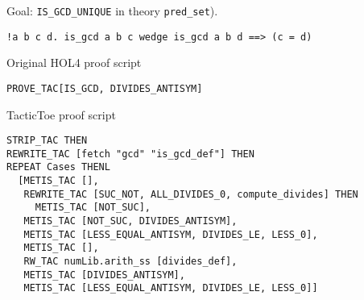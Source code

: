 \documentclass[runningheads,a4paper,draft]{svjour3}
\def\holfour{\textsf{HOL4}\xspace}
\def\tactictoe{\textsf{TacticToe}\xspace}
\begin{document}


%

Goal: \texttt{IS\_GCD\_UNIQUE} in theory \texttt{pred\_set}).
\begin{lstlisting}[language=SMLSmall,frame=tb]
!a b c d. is_gcd a b c wedge is_gcd a b d ==> (c = d)
\end{lstlisting}

Original \holfour proof script
\begin{lstlisting}[language=SMLSmall,frame=tb]
PROVE_TAC[IS_GCD, DIVIDES_ANTISYM]
\end{lstlisting}

\vspace{5mm}

\tactictoe proof script
\begin{lstlisting}[language=SMLSmall,frame=tb]
STRIP_TAC THEN 
REWRITE_TAC [fetch "gcd" "is_gcd_def"] THEN 
REPEAT Cases THENL 
  [METIS_TAC [], 
   REWRITE_TAC [SUC_NOT, ALL_DIVIDES_0, compute_divides] THEN 
     METIS_TAC [NOT_SUC], 
   METIS_TAC [NOT_SUC, DIVIDES_ANTISYM], 
   METIS_TAC [LESS_EQUAL_ANTISYM, DIVIDES_LE, LESS_0], 
   METIS_TAC [], 
   RW_TAC numLib.arith_ss [divides_def], 
   METIS_TAC [DIVIDES_ANTISYM],
   METIS_TAC [LESS_EQUAL_ANTISYM, DIVIDES_LE, LESS_0]]
\end{lstlisting}
\end{document}
